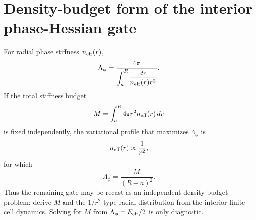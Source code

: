 \section{Density-budget form of the interior phase-Hessian gate}
For radial phase stiffness \(n_{\rm eff}(r)\),
\[
  \Lambda_\phi
  =
  \frac{4\pi}
       {\displaystyle\int_a^R\frac{dr}{n_{\rm eff}(r)r^2}}.
\]
If the total stiffness budget
\[
  M=\int_a^R4\pi r^2 n_{\rm eff}(r)\,dr
\]
is fixed independently, the variational profile that maximizes
\(\Lambda_\phi\) is
\[
  n_{\rm eff}(r)\propto \frac1{r^2},
\]
for which
\[
  \Lambda_\phi=\frac{M}{(R-a)^2}.
\]
Thus the remaining gate may be recast as an independent density-budget problem:
derive \(M\) and the \(1/r^2\)-type radial distribution from the interior
finite-cell dynamics.  Solving for \(M\) from \(\Lambda_\phi=E_{\rm eff}/2\) is
only diagnostic.
